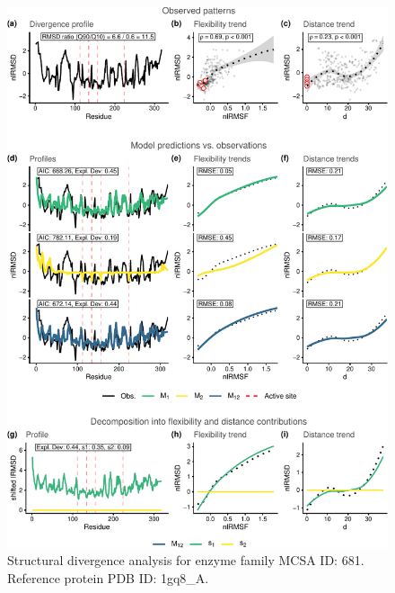 \documentclass[
]{article}
\begin{document}
\clearpage
\begin{figure}[H]
\centering


\begin{center}\includegraphics{supplementary_material_files/figure-latex/generate_figures-26} \end{center}

\caption{Structural divergence analysis for enzyme family MCSA ID: 681. Reference protein PDB ID: 1gq8\_A.}
\end{figure}
\end{document}
